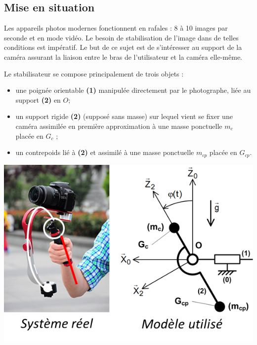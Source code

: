 \documentclass[10pt,fleqn]{article} %
\begin{document}
\def\pathfig{images}

\vspace{5cm}
\pagestyle{fancy}
\thispagestyle{plain}

\def\columnseprulecolor{\color{ocre}}
\setlength{\columnseprule}{0.4pt} 

\def\pathfig{images}

\ifprof
\begin{multicols}{2}
\else
\begin{multicols}{2}
\fi

\subsection*{Mise en situation}

Les appareils photos modernes fonctionnent en rafales : 8 à 10 images par seconde et en mode vidéo. Le besoin de
stabilisation de l’image dans de telles conditions est impératif. Le but de ce sujet est de s’intéresser au support de la caméra assurant la liaison entre le bras de l'utilisateur et la caméra elle-même.

Le stabilisateur se compose principalement de trois objets :
\begin{itemize}
\item une poignée orientable \textbf{(1)} manipulée directement par le photographe, liée au support \textbf{(2)} en $O$;
\item un support rigide \textbf{(2)} (supposé sans masse) sur lequel vient se fixer une caméra assimilée en première approximation à une masse ponctuelle $m_c$ placée en $G_c$ ;
\item un contrepoids lié à \textbf{(2)} et assimilé à une masse ponctuelle $m_{cp}$ placée en $G_{cp}$.
\end{itemize}

\begin{center}
\includegraphics[width=.7\linewidth]{images/fig_01}
\end{center}


\end{multicols}
\end{multicols}
\end{document}
